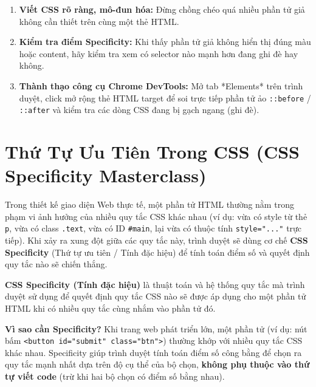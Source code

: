 \documentclass[11pt,oneside]{book}
\newcommand{\codeinline}[1]{\textcolor{accentOrange}{\texttt{#1}}}
\newcommand{\term}[1]{\textbf{\textcolor{primaryBlue}{#1}}}
\begin{document}
\begin{tipBox}
\begin{enumerate}[leftmargin=1.5em, itemsep=3pt, parsep=0pt]
    \item \textbf{Viết CSS rõ ràng, mô-đun hóa:} Đừng chồng chéo quá nhiều phần tử giả không cần thiết trên cùng một thẻ HTML.
    \item \textbf{Kiểm tra điểm Specificity:} Khi thấy phần tử giả không hiển thị đúng màu hoặc content, hãy kiểm tra xem có selector nào mạnh hơn đang ghi đè hay không.
    \item \textbf{Thành thạo công cụ Chrome DevTools:} Mở tab *Elements* trên trình duyệt, click mở rộng thẻ HTML target để soi trực tiếp phần tử ảo \codeinline{::before} / \codeinline{::after} và kiểm tra các dòng CSS đang bị gạch ngang (ghi đè).
\end{enumerate}
\end{tipBox}




\section{Thứ Tự Ưu Tiên Trong CSS (CSS Specificity Masterclass)}


Trong thiết kế giao diện Web thực tế, một phần tử HTML thường nằm trong phạm vi ảnh hưởng của nhiều quy tắc CSS khác nhau (ví dụ: vừa có style từ thẻ \codeinline{p}, vừa có class \codeinline{.text}, vừa có ID \codeinline{\#main}, lại vừa có thuộc tính \codeinline{style="..."} trực tiếp). Khi xảy ra xung đột giữa các quy tắc này, trình duyệt sẽ dùng cơ chế \term{CSS Specificity} (Thứ tự ưu tiên / Tính đặc hiệu) để tính toán điểm số và quyết định quy tắc nào sẽ chiến thắng.

\begin{conceptBox}
\textbf{CSS Specificity (Tính đặc hiệu)} là thuật toán và hệ thống quy tắc mà trình duyệt sử dụng để quyết định quy tắc CSS nào sẽ được áp dụng cho một phần tử HTML khi có nhiều quy tắc cùng nhắm vào phần tử đó.
\par\vspace{4pt}
\textbf{Vì sao cần Specificity?} Khi trang web phát triển lớn, một phần tử (ví dụ: nút bấm \codeinline{<button id="submit" class="btn">}) thường khớp với nhiều quy tắc CSS khác nhau. Specificity giúp trình duyệt tính toán điểm số công bằng để chọn ra quy tắc mạnh nhất dựa trên độ cụ thể của bộ chọn, \textbf{không phụ thuộc vào thứ tự viết code} (trừ khi hai bộ chọn có điểm số bằng nhau).
\end{conceptBox}
\end{document}
